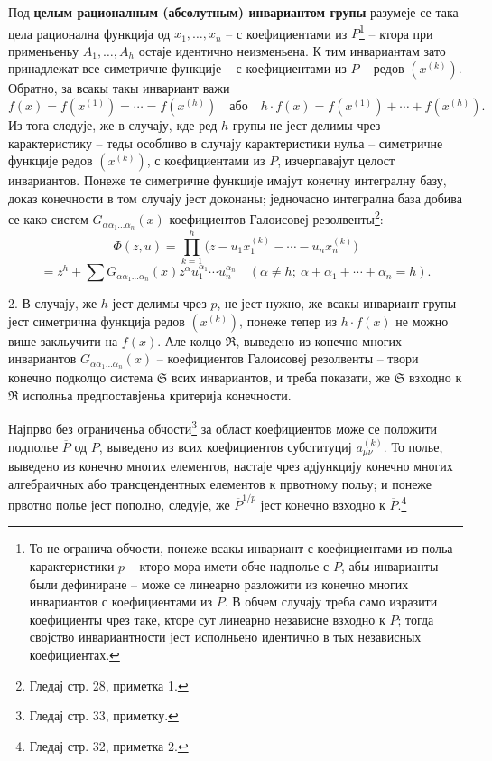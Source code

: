 ﻿\documentclass[11pt]{article}
\begin{document}
Под \textbf{целым рационалным (абсолутным) инвариантом групы} разумеје се така цела рационална функција од $x_1,\ldots,x_n$ -- с коефициентами из $P$\footnote{То не огранича обчости, понеже всакы инвариант с коефициентами из польа карактеристики $p$ -- кторо мора имети обче надполье с $P$, абы инварианты были дефиниране -- може се линеарно разложити из конечно многих инвариантов с коефициентами из $P$. В обчем случају треба само изразити коефициенты чрез таке, кторе сут линеарно независне взходно к $P$; тогда својство инвариантности јест исполньено идентично в тых независных коефициентах.} -- ктора при применьеньу $A_1,\ldots,A_h$ остаје идентично неизменьена. К тим инвариантам зато принадлежат все симетричне функције -- с коефициентами из $P$ -- редов $(x^{(k)})$. Обратно, за всакы такы инвариант важи
\[
 f(x)=f(x^{(1)})=\cdots=f(x^{(h)})
 \quad\text{або}\quad
 h\cdot f(x)=f(x^{(1)})+\cdots+f(x^{(h)}).
\]
Из тога следује, же в случају, кде ред $h$ групы не јест делимы чрез карактеристику -- теды особливо в случају карактеристики нульа -- симетричне функције редов $(x^{(k)})$, с коефициентами из $P$, изчерпавајут целост инвариантов. Понеже те симетричне функције имајут конечну интегралну базу, доказ конечности в том случају јест доконаны; једночасно интегрална база добива се како систем $G_{\alpha\alpha_1\ldots\alpha_n}(x)$ коефициентов Галоисовеј резолвенты\footnote{Гледај стр. 28, приметка 1.}:
\[
 \Phi(z,u)=\prod_{k=1}^{h}\bigl(z-u_1x_1^{(k)}-\cdots-u_nx_n^{(k)}\bigr)
\]
\[
 =z^h+\sum G_{\alpha\alpha_1\ldots\alpha_n}(x)
 z^{\alpha}u_1^{\alpha_1}\cdots u_n^{\alpha_n}
 \quad(\alpha\ne h;\ \alpha+\alpha_1+\cdots+\alpha_n=h).
\]

2. В случају, же $h$ јест делимы чрез $p$, не јест нужно, же всакы инвариант групы јест симетрична функција редов $(x^{(k)})$, понеже тепер из $h\cdot f(x)$ не можно више закльучити на $f(x)$. Але колцо $\mathfrak R$, выведено из конечно многих инвариантов $G_{\alpha\alpha_1\ldots\alpha_n}(x)$ -- коефициентов Галоисовеј резолвенты -- твори конечно подколцо система $\mathfrak S$ всих инвариантов, и треба показати, же $\mathfrak S$ взходно к $\mathfrak R$ исполньа предпоставјеньа критерија конечности.

Најпрво без ограниченьа обчости\footnote{Гледај стр. 33, приметку.} за област коефициентов може се положити подполье $\overline P$ од $P$, выведено из всих коефициентов субституциј $a_{\mu\nu}^{(k)}$. То полье, выведено из конечно многих елементов, настаје чрез адјункцију конечно многих алгебраичных або трансцендентных елементов к првотному польу; и понеже првотно полье јест пополно, следује, же $\overline P^{1/p}$ јест конечно взходно к $\overline P$.\footnote{Гледај стр. 32, приметка 2.}
\end{document}
